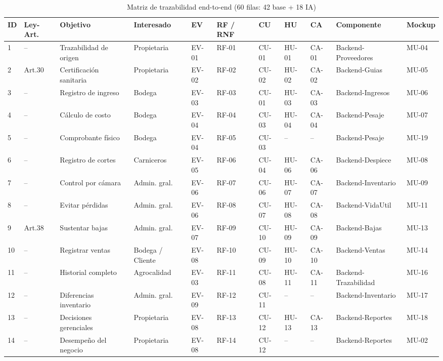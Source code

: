 \documentclass[11pt,a4paper]{article}
\begin{document}
\scriptsize
\begin{longtable}{|p{0.3cm}|p{1.2cm}|p{2.2cm}|p{1.5cm}|p{0.7cm}|p{0.8cm}|p{0.7cm}|p{0.8cm}|p{0.8cm}|p{2.3cm}|p{1cm}|}
\caption{Matriz de trazabilidad end-to-end (60 filas: 42 base + 18 IA)}\\
\hline
\textbf{ID} & \textbf{Ley-Art.} & \textbf{Objetivo} & \textbf{Interesado} & \textbf{EV} & \textbf{RF / RNF} & \textbf{CU} & \textbf{HU} & \textbf{CA} & \textbf{Componente} & \textbf{Mockup} \\
\hline
1 & -- & Trazabilidad de origen & Propietaria & EV-01 & RF-01 & CU-01 & HU-01 & CA-01 & Backend-Proveedores & MU-04 \\
2 & Art.30 & Certificación sanitaria & Propietaria & EV-02 & RF-02 & CU-02 & HU-02 & CA-02 & Backend-Guias & MU-05 \\
3 & -- & Registro de ingreso & Bodega & EV-03 & RF-03 & CU-01 & HU-03 & CA-03 & Backend-Ingresos & MU-06 \\
4 & -- & Cálculo de costo & Bodega & EV-04 & RF-04 & CU-03 & HU-04 & CA-04 & Backend-Pesaje & MU-07 \\
5 & -- & Comprobante físico & Bodega & EV-04 & RF-05 & CU-03 & -- & -- & Backend-Pesaje & MU-19 \\
6 & -- & Registro de cortes & Carniceros & EV-05 & RF-06 & CU-04 & HU-06 & CA-06 & Backend-Despiece & MU-08 \\
7 & -- & Control por cámara & Admin. gral. & EV-06 & RF-07 & CU-06 & HU-07 & CA-07 & Backend-Inventario & MU-09 \\
8 & -- & Evitar pérdidas & Admin. gral. & EV-06 & RF-08 & CU-07 & HU-08 & CA-08 & Backend-VidaUtil & MU-11 \\
9 & Art.38 & Sustentar bajas & Admin. gral. & EV-07 & RF-09 & CU-10 & HU-09 & CA-09 & Backend-Bajas & MU-13 \\
10 & -- & Registrar ventas & Bodega / Cliente & EV-08 & RF-10 & CU-09 & HU-10 & CA-10 & Backend-Ventas & MU-14 \\
11 & -- & Historial completo & Agrocalidad & EV-03 & RF-11 & CU-08 & HU-11 & CA-11 & Backend-Trazabilidad & MU-16 \\
12 & -- & Diferencias inventario & Admin. gral. & EV-09 & RF-12 & CU-11 & -- & -- & Backend-Inventario & MU-17 \\
13 & -- & Decisiones gerenciales & Propietaria & EV-08 & RF-13 & CU-12 & HU-13 & CA-13 & Backend-Reportes & MU-18 \\
14 & -- & Desempeño del negocio & Propietaria & EV-08 & RF-14 & CU-12 & -- & -- & Backend-Reportes & MU-02 \\

\end{longtable}
\end{document}
